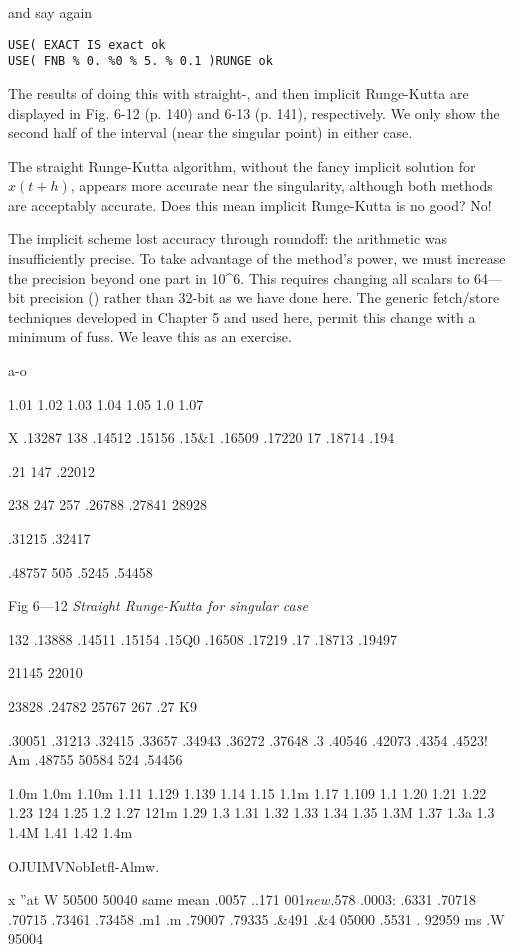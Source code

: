 {{and say again
\begin{lstlisting}
USE( EXACT IS exact ok
USE( FNB % 0. %0 % 5. % 0.1 )RUNGE ok
\end{lstlisting}

The results of doing this with straight-, and then implicit Runge-Kutta are displayed in Fig. 6-12 (p. 140) and 6-13 (p. 141), respectively. We only show the second half of the interval (near the singular point) in either case.

The straight Runge-Kutta algorithm, without the fancy implicit solution for $x(t +h)$, appears more accurate near the singularity, although both methods are acceptably accurate. Does this mean implicit Runge-Kutta is no good? No!

The implicit scheme lost accuracy through roundoff: the arithmetic was insufficiently precise. To take advantage of the method’s power, we must increase the precision beyond one part in 10^{6}. This requires changing all scalars to 64—bit precision () rather than 32-bit as we have done here. The generic fetch/store techniques developed in Chapter 5 and used here, permit this change with a minimum of fuss. We leave this as an exercise.

a-o

1.01%
1.02%
1.03%
1.04%
1.05%
1.0%
1.07%

X
.13287
138%
.14512
.15156
.15&1
.16509
.17220
17%
.18714
.194%

.21 147
.22012

238%
247%
257%
.26788
.27841
28928

.31215
.32417

.48757
505%
.5245
.54458

Fig 6—12 \textit{Straight Runge-Kutta for singular case}

132%
.13888
.14511
.15154
.15Q0
.16508
.17219
.17%
.18713
.19497

21145
22010

23828
.24782
25767
267%
.27 K9

.30051
.31213
.32415
.33657
.34943
.36272
.37648
.3%
.40546
.42073
.4354
.4523!
Am
.48755
50584
524%
.54456

 

1.0m
1.0m
1.10m
1.11%
1.129
1.139
1.14%
1.15%
1.1m
1.17%
1.109
1.1%
1.20%
1.21%
1.22%
1.23%
124%
1.25%
1.2%
1.27%
121m
1.29%
1.3%
1.31%
1.32%
1.33%
1.34%
1.35%
1.3M
1.37%
1.3a
1.3%
1.4M
1.41%
1.42%
1.4m

OJUIMVNobIetfl-Almw.

x ”at
W 50500
50040 same
mean .0057
..171 001$
new .$578
.0003: .6331
.70718 .70715
.73461 .73458
.m1 .m
.79007 .79335
.&491 .&4%
05000 .5531
.%
92959 ms
.W 95004

}}
